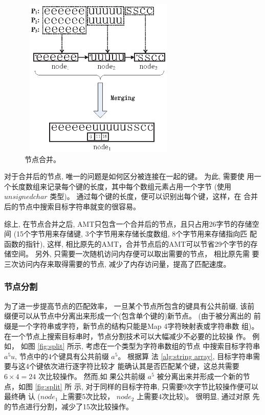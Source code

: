 \begin{figure}[H]
  \centering
  \includegraphics[height=3in, width=3in]{figures/2_MPM/node_merge}
  \caption{节点合并。}
  \label{fig:merge}
\end{figure}

对于合并后的节点, 唯一的问题是如何区分被连接在一起的键。 为此, 需要使
用一个长度数组来记录每个键的长度，其中每个数组元素占用一个字节 (使用
$unsigned char$ 类型)。 通过每个键的长度，便可以识别出每个键，这样，在
合并后的节点中搜索目标字符串就变的很容易。

综上, 在节点合并之后, AMT只包含一个合并后的节点，且只占用26字节的存储空
间 (15个字节用来存储键, 3个字节用来存储长度数组, 8个字节用来存储指向匹
配函数的指针), 这样, 相比原先的AMT，合并节点后的AMT可以节省29个字节的存
储空间。 另外, 只需要一次随机访问内存便可以取出需要的节点， 相比原先需
要三次访问内存来取得需要的节点, 减少了内存访问量，提高了匹配速度。


\subsubsection{节点分割}
\label{sec:node split}

为了进一步提高节点的匹配效率， 一旦某个节点所包含的键具有公共前缀, 该前
缀便可以从节点中分离出来形成一个(包含单个键的)新节点。 (由于被分离出的
前缀是一个字符串或字符，新节点的结构只能是Map 4字符映射表或字符串数
组)。 在一个节点上搜索目标串时，节点分割技术可以大幅减少不必要的比较操
作。 例如， 如图 \ref{fig:split} 所示, 考虑在一个类型为字符串数组的节点
中搜索目标字符串 $a^5u$, 节点中的4个键具有公共前缀 $a^5$。 根据算
法 \ref{alg:string array}, 目标字符串需要与这4个键依次进行逐字符比较才
能确认其是否匹配某个键，这总共需要 $6 \times 4 = 24$ 次比较操作。 然而,如
果公共前缀 $a^5$ 被分离出来并形成一个新的节点，如图 \ref{fig:split} 所
示, 对于同样的目标字符串, 只需要9次字节比较操作便可以最终确
认 ($node_1$ 上需要5次比较， $node_2$ 上需要4次比较)。 很明显, 通过对原
先的节点进行分割，减少了15次比较操作。

